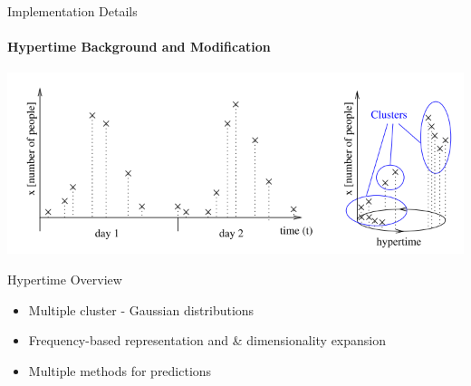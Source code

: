 \documentclass{beamer}
\begin{document}
\begin{frame}[t]{Implementation Details}
  \framesubtitle{Hypertime Background and Modification}
    \includegraphics[width=0.80\columnwidth]{images/hypertime_clustering.png}

    \begin{block}{Hypertime Overview}
      \begin{itemize}
        \item Multiple cluster - Gaussian distributions
        \item Frequency-based representation and \& dimensionality expansion
        \item Multiple methods for predictions
      \end{itemize}
    \end{block}
\end{frame}
\end{document}

